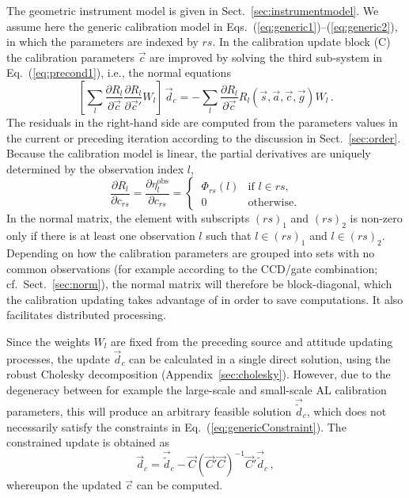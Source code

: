 \documentclass[structabstract]{aa}
\begin{document}
The geometric instrument model is given in Sect.~\ref{sec:instrumentmodel}.
We assume here the generic calibration model in 
Eqs.~(\ref{eq:generic1})--(\ref{eq:generic2}), in which the parameters are 
indexed by $rs$. In the calibration update block (C) the calibration parameters 
$\vec{c}$ are improved by solving the third sub-system in Eq.~(\ref{eq:precond1}),
i.e., the normal equations
\begin{equation} \label{eq:normC}
\left[\sum_l \frac{\partial R_l}{\partial\vec{c}}
\frac{\partial R_l}{\partial\vec{c}'} W_l \right]\,\vec{d}_c
= -\sum_l \frac{\partial R_l}{\partial\vec{c}}
R_l(\vec{s},\vec{a},\vec{c},\vec{g}) W_l \, .
\end{equation}
The residuals in the right-hand side are computed from the parameters
values in the current or preceding iteration according to the discussion
in Sect.~\ref{sec:order}. Because the calibration model is linear, the partial 
derivatives are uniquely determined by the observation index $l$,
\begin{equation} \label{eq:pdC}
\frac{\partial R_l}{\partial c_{rs}} = \frac{\partial\eta^\text{obs}_l}{\partial c_{rs}} 
= \begin{cases} ~\Phi_{rs}(l) & \text{if $l\in rs$}, \\ ~0 & \text{otherwise}.
\end{cases}
\end{equation}
In the normal matrix, the element with subscripts $(rs)_1$ and $(rs)_2$ is
non-zero only if there is at least one observation $l$ such that
$l\in (rs)_1$ and $l\in (rs)_2$. Depending on how the calibration parameters 
are grouped into sets with no common observations (for example according 
to the CCD/gate combination; cf.\ Sect.~\ref{sec:norm}), the 
normal matrix will therefore be block-diagonal, which the calibration updating
takes advantage of in order to save computations. It also
facilitates distributed processing.
 
Since the weights $W_l$ are fixed from the preceding source and attitude
updating processes, the update $\vec{d}_c$ can be calculated in a 
single direct solution, using the robust Cholesky decomposition 
(Appendix~\ref{sec:cholesky}). However, due to the degeneracy between for 
example the large-scale and small-scale AL calibration parameters, this will
produce an arbitrary feasible solution $\vec{\tilde{d}}_c$, which does not 
necessarily satisfy the constraints in Eq.~(\ref{eq:genericConstraint}). The
constrained update is obtained as
\begin{equation} \label{eq:calCon}
\vec{d}_c = \vec{\tilde{d}}_c - \vec{C}(\vec{C}'\vec{C})^{-1}\vec{C}'\vec{\tilde{d}}_c \, ,
\end{equation}
whereupon the updated $\vec{c}$ can be computed.
\end{document}

